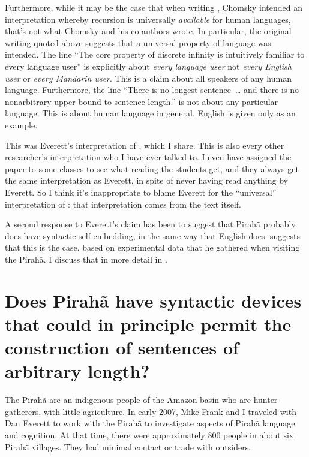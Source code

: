 \documentclass{article}
\begin{document}
Furthermore, while it may be the case that when writing \citet{hauser2002faculty}, Chomsky intended an interpretation whereby recursion is universally \textit{available} for human languages, that's not what Chomsky and his co-authors wrote.
In particular, the original writing quoted above suggests that a universal property of language was intended. The line ``The core property of discrete infinity is intuitively familiar to every language user'' is explicitly about \textit{every language user} not \textit{every English user} or \textit{every Mandarin user}.  This is a claim about all speakers of any human language. Furthermore, the line ``There is no longest sentence~\ldots{} and there is no nonarbitrary upper bound to sentence length.'' is not about any particular language. This is about human language in general. English is given only as an example. 

This was Everett’s interpretation of \citet{hauser2002faculty}, which I share. This is also every other researcher’s interpretation who I have ever talked to. I even have assigned the \citet{hauser2002faculty} paper to some classes to see what reading the students get, and they always get the same interpretation as Everett, in spite of never having read anything by Everett.  So I think it’s inappropriate to blame Everett for the ``universal'' interpretation of \citet{hauser2002faculty}: that interpretation comes from the text itself. 

A second response to Everett’s claim has been to suggest that Pirahã probably does have syntactic self-embedding, in the same way that English does. \citet{sauerland2018false} suggests that this is the case, based on experimental data that he gathered when visiting the Pirahã. I discuss that in more detail in .

\section{Does Pirahã have  syntactic devices that could in principle permit the construction of sentences of arbitrary length?}

The Pirahã are an indigenous people of the Amazon basin who are hunter\hyp gatherers, with little agriculture.  In early 2007, Mike Frank and I traveled with Dan Everett to work with the Pirahã to investigate aspects of Pirahã language and cognition. At that time, there were approximately 800 people in about six Pirahã villages. They had minimal contact or trade with outsiders. 
\end{document}
